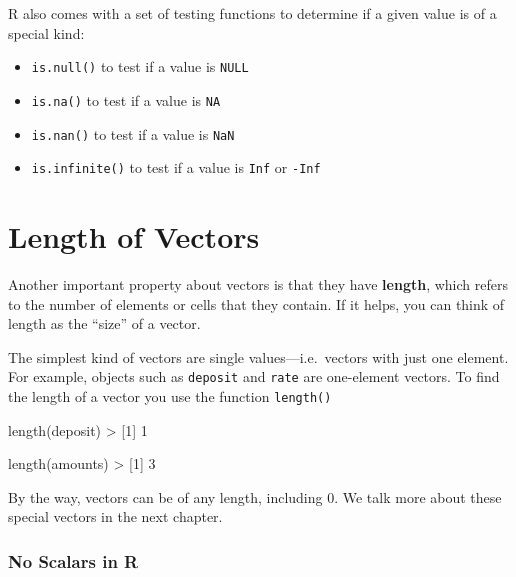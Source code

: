 \documentclass[
]{book}
\newenvironment{Shaded}{\begin{snugshade}}{\end{snugshade}}
\newcommand{\DecValTok}[1]{\textcolor[rgb]{0.00,0.00,0.81}{#1}}
\newcommand{\FunctionTok}[1]{\textcolor[rgb]{0.00,0.00,0.00}{#1}}
\newcommand{\NormalTok}[1]{#1}
\newcommand{\SpecialCharTok}[1]{\textcolor[rgb]{0.00,0.00,0.00}{#1}}
\begin{document}
R also comes with a set of testing functions to determine if a given value is
of a special kind:

\begin{itemize}
\item
  \texttt{is.null()} to test if a value is \texttt{NULL}
\item
  \texttt{is.na()} to test if a value is \texttt{NA}
\item
  \texttt{is.nan()} to test if a value is \texttt{NaN}
\item
  \texttt{is.infinite()} to test if a value is \texttt{Inf} or \texttt{-Inf}
\end{itemize}

\hypertarget{length-of-vectors}{%
\section{Length of Vectors}\label{length-of-vectors}}

Another important property about vectors is that they have \textbf{length}, which
refers to the number of elements or cells that they contain. If it helps, you
can think of length as the ``size'' of a vector.

The simplest kind of vectors are single values---i.e.~vectors with just one
element. For example, objects such as \texttt{deposit} and \texttt{rate} are one-element
vectors. To find the length of a vector you use the function \texttt{length()}

\begin{Shaded}
\begin{Highlighting}[]
\FunctionTok{length}\NormalTok{(deposit)}
\SpecialCharTok{\textgreater{}}\NormalTok{ [}\DecValTok{1}\NormalTok{] }\DecValTok{1}

\FunctionTok{length}\NormalTok{(amounts)}
\SpecialCharTok{\textgreater{}}\NormalTok{ [}\DecValTok{1}\NormalTok{] }\DecValTok{3}
\end{Highlighting}
\end{Shaded}

By the way, vectors can be of any length, including 0. We talk more about
these special vectors in the next chapter.

\hypertarget{no-scalars-in-r}{%
\subsubsection*{No Scalars in R}\label{no-scalars-in-r}}
\end{document}

